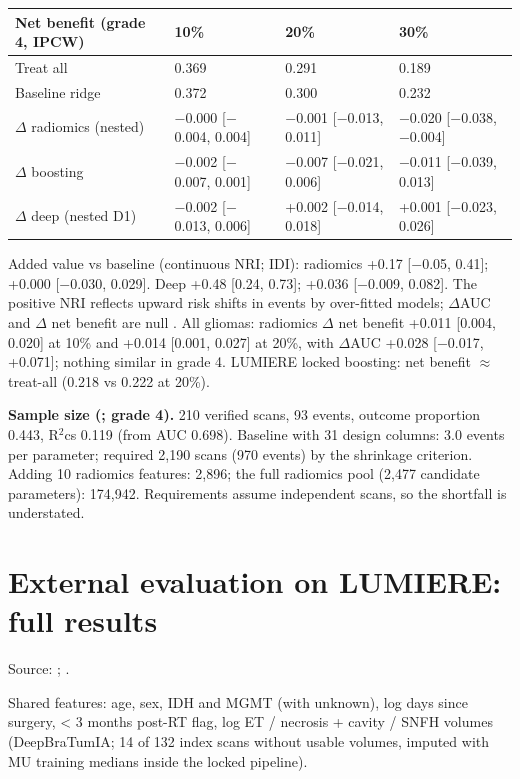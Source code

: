 \documentclass[11pt,a4paper]{article}
\begin{document}
\begin{table}[H]
\centering
\small
\begin{tabularx}{\linewidth}{@{}L R{3.5cm} R{3.5cm} R{3.5cm}@{}}
\toprule
Net benefit (grade 4, IPCW) & 10\% & 20\% & 30\% \\
\midrule
Treat all & 0.369 & 0.291 & 0.189 \\
Baseline ridge & 0.372 & 0.300 & 0.232 \\
$\Delta$ radiomics (nested) & $-$0.000 [$-$0.004, 0.004] & $-$0.001 [$-$0.013, 0.011] & $-$0.020 [$-$0.038, $-$0.004] \\
$\Delta$ boosting & $-$0.002 [$-$0.007, 0.001] & $-$0.007 [$-$0.021, 0.006] & $-$0.011 [$-$0.039, 0.013] \\
$\Delta$ deep (nested D1) & $-$0.002 [$-$0.013, 0.006] & +0.002 [$-$0.014, 0.018] & +0.001 [$-$0.023, 0.026] \\
\bottomrule
\end{tabularx}
\end{table}

Added value vs baseline (continuous NRI; IDI): radiomics +0.17 [$-$0.05, 0.41]; +0.000 [$-$0.030, 0.029]. Deep
+0.48 [0.24, 0.73]; +0.036 [$-$0.009, 0.082]. The positive NRI reflects upward risk shifts in events by
over-fitted models; $\Delta$AUC and $\Delta$ net benefit are null \citep{pencina2008}. All gliomas: radiomics
$\Delta$ net benefit +0.011 [0.004, 0.020] at 10\% and +0.014 [0.001, 0.027] at 20\%, with $\Delta$AUC +0.028
[$-$0.017, +0.071]; nothing similar in grade 4. LUMIERE locked boosting: net benefit $\approx$ treat-all
(0.218 vs 0.222 at 20\%).

\textbf{Sample size (\citealp{riley2020}; grade 4).} 210 verified scans, 93 events, outcome proportion 0.443,
R$^{2}$cs 0.119 (from AUC 0.698). Baseline with 31 design columns: 3.0 events per parameter; required 2,190
scans (970 events) by the shrinkage criterion. Adding 10 radiomics features: 2,896; the full radiomics pool
(2,477 candidate parameters): 174,942. Requirements assume independent scans, so the shortfall is understated.

\FloatBarrier
\section{External evaluation on LUMIERE: full results}\label{sec:S13}

Source: ;
.

Shared features: age, sex, IDH and MGMT (with unknown), log days since surgery, < 3 months post-RT flag, log
ET / necrosis + cavity / SNFH volumes (DeepBraTumIA; 14 of 132 index scans without usable volumes, imputed
with MU training medians inside the locked pipeline).
\end{document}
